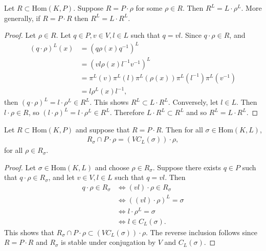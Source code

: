\begin{lemma} \label{pr:lrl} Let $R \subset \mathrm{Hom}(K, P)$. Suppose $R = P \cdot \rho$ for some $\rho \in R$. Then $R^L = L\cdot \rho^L$.
	More generally, if $R = P \cdot R$ then $R^L = L \cdot R^L$.
\end{lemma}
\begin{proof}
	Let $\rho \in R$. Let $q \in P, v \in V, l \in L$ such that $q = vl$. Since $q\cdot\rho \in R$, and
	\begin{align*}
		(q \cdot \rho)^L(x) &= (q\rho(x)q^{-1})^L \\
			&= (vl\rho(x)l^{-1}v^{-1})^L \\
			&= \pi^L(v)\pi^L(l)\pi^L(\rho(x))\pi^L\left(l^{-1}\right)\pi^L\left(v^{-1}\right) \\
			&= l \rho^L(x) l^{-1},
	\end{align*}
	then $(q \cdot \rho)^L = l \cdot \rho^L \in R^L$. This shows $R^L \subset L \cdot R^L$. Conversely, let $l \in L$. Then $l \cdot \rho \in R$, so $(l \cdot \rho)^L = l\cdot \rho^L \in R^L$. Therefore $L\cdot R^L \subset R^L$ and so $R^L = L \cdot R^L$.
\end{proof}

\begin{lemma} \label{rsigma:vcl} Let $R \subset \mathrm{Hom}(K, P)$ and suppose that $R = P \cdot R$. Then for all $\sigma \in \mathrm{Hom}(K, L)$,
	\begin{align*}
		R_\sigma \cap P \cdot \rho = \left(VC_L(\sigma)\right) \cdot \rho,
	\end{align*}
	for all $\rho \in R_\sigma$.
\end{lemma}
\begin{proof}
	Let $\sigma \in \mathrm{Hom}(K, L)$ and choose $\rho \in R_\sigma$. Suppose there exists $q \in P$ such that $q \cdot \rho \in R_\sigma$, and let $v \in V, l \in L$ such that $q = vl$. Then
	\begin{align*}
		q \cdot \rho \in R_\sigma &\Leftrightarrow (vl) \cdot \rho \in R_\sigma \\
		&\Leftrightarrow \left( (vl) \cdot \rho\right)^L = \sigma \\
		&\Leftrightarrow l\cdot \rho^L = \sigma \\
		&\Leftrightarrow l \in C_L(\sigma).
	\end{align*}
	This shows that $R_\sigma \cap P \cdot \rho \subset \left(VC_L(\sigma)\right) \cdot \rho$. The reverse inclusion follows since $R = P \cdot R$ and $R_\sigma$ is stable under conjugation by $V$ and $C_L(\sigma)$.
\end{proof}

